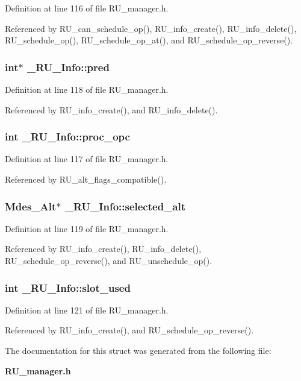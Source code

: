 Definition at line 116 of file RU\_\-manager.h.

Referenced by RU\_\-can\_\-schedule\_\-op(), RU\_\-info\_\-create(), RU\_\-info\_\-delete(), RU\_\-schedule\_\-op(), RU\_\-schedule\_\-op\_\-at(), and RU\_\-schedule\_\-op\_\-reverse().
\subsubsection{\setlength{\rightskip}{0pt plus 5cm}int$\ast$ \bf{\_\-RU\_\-Info::pred}}\label{struct__RU__Info_e6963e947427f45cfef9c739a47fdfe0}




Definition at line 118 of file RU\_\-manager.h.

Referenced by RU\_\-info\_\-create(), and RU\_\-info\_\-delete().
\subsubsection{\setlength{\rightskip}{0pt plus 5cm}int \bf{\_\-RU\_\-Info::proc\_\-opc}}\label{struct__RU__Info_ed052fe9a0e2efc69743c07859b5d811}




Definition at line 117 of file RU\_\-manager.h.

Referenced by RU\_\-alt\_\-flags\_\-compatible().
\subsubsection{\setlength{\rightskip}{0pt plus 5cm}Mdes\_\-Alt$\ast$ \bf{\_\-RU\_\-Info::selected\_\-alt}}\label{struct__RU__Info_0832bb8b97ce3d88bce7e843341aa41c}




Definition at line 119 of file RU\_\-manager.h.

Referenced by RU\_\-info\_\-create(), RU\_\-info\_\-delete(), RU\_\-schedule\_\-op\_\-reverse(), and RU\_\-unschedule\_\-op().
\subsubsection{\setlength{\rightskip}{0pt plus 5cm}int \bf{\_\-RU\_\-Info::slot\_\-used}}\label{struct__RU__Info_1da33123eb56a1da68de8071a75371ef}




Definition at line 121 of file RU\_\-manager.h.

Referenced by RU\_\-info\_\-create(), and RU\_\-schedule\_\-op\_\-reverse().

The documentation for this struct was generated from the following file:\begin{CompactItemize}
\item 
\bf{RU\_\-manager.h}\end{CompactItemize}
